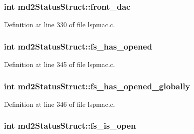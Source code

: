 \hypertarget{structmd2StatusStruct_a3be73c48b09190241a2bcb801af5b97c}{
\subsubsection[{front\-\_\-dac}]{\setlength{\rightskip}{0pt plus 5cm}int md2\-Status\-Struct\-::front\-\_\-dac}}\label{structmd2StatusStruct_a3be73c48b09190241a2bcb801af5b97c}


Definition at line 330 of file lspmac.\-c.

\hypertarget{structmd2StatusStruct_ab961c2ba24a1a8c95a88dec25319e712}{
\subsubsection[{fs\-\_\-has\-\_\-opened}]{\setlength{\rightskip}{0pt plus 5cm}int md2\-Status\-Struct\-::fs\-\_\-has\-\_\-opened}}\label{structmd2StatusStruct_ab961c2ba24a1a8c95a88dec25319e712}


Definition at line 345 of file lspmac.\-c.

\hypertarget{structmd2StatusStruct_ac95696b7ed35ccfdfb6aeeee879bdb65}{
\subsubsection[{fs\-\_\-has\-\_\-opened\-\_\-globally}]{\setlength{\rightskip}{0pt plus 5cm}int md2\-Status\-Struct\-::fs\-\_\-has\-\_\-opened\-\_\-globally}}\label{structmd2StatusStruct_ac95696b7ed35ccfdfb6aeeee879bdb65}


Definition at line 346 of file lspmac.\-c.

\hypertarget{structmd2StatusStruct_aca3722c109e6646bd41fb269a32261f2}{
\subsubsection[{fs\-\_\-is\-\_\-open}]{\setlength{\rightskip}{0pt plus 5cm}int md2\-Status\-Struct\-::fs\-\_\-is\-\_\-open}}\label{structmd2StatusStruct_aca3722c109e6646bd41fb269a32261f2}


